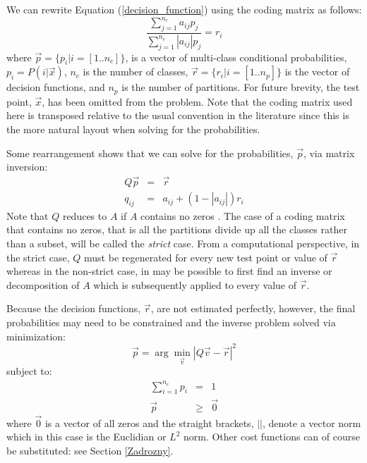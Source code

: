 We can rewrite Equation (\ref{decision_function}) using the coding 
matrix as follows:
\begin{equation}
	\frac{\sum_{j=1}^{n_c} a_{ij} p_j}{\sum_{j=1}^{n_c} |a_{ij}| p_j} = r_i
	\label{non_hier}
\end{equation}
where $\vec p=\lbrace p_i | i=[1..n_c]\rbrace$, 
is a vector of multi-class conditional probabilities, $p_i=P(i|\vec x)$, 
$n_c$ is the number of classes,
$\vec r=\lbrace r_i| i=[1..n_p]\rbrace$ 
is the vector of decision functions,
and
$n_p$ is the number of partitions.
For future brevity, the test point, $\vec x$, has been omitted from the problem. 
Note that the coding matrix used here is transposed relative to the usual
convention in the literature since this is the more natural layout when 
solving for the probabilities.

Some rearrangement shows that
we can solve for the probabilities, $\vec p$, via matrix inversion:
\begin{eqnarray}
	Q \vec p & = & \vec r \label{basic_system}\\
	q_{ij} & = & a_{ij} + (1-|a_{ij}|) r_i 
	\label{matrix_equation2}
\end{eqnarray}
Note that $Q$ reduces to $A$ if $A$ contains no zeros \citep{Kong_Dietterich1997}.
The case of a coding matrix that contains no zeros, that is all the partitions divide up all the
classes rather than a subset, will be called the {\it strict} case.
From a computational perspective,
in the strict case,
$Q$ must be regenerated for every new test point or value of $\vec r$ 
whereas in the non-strict case, in may be possible to first find an inverse or
decomposition of $A$ which is subsequently
applied to every value of $\vec r$.

Because the decision functions, $\vec r$, are not estimated perfectly, however,
the final probabilities may need to be constrained and the inverse
problem solved via minimization:
\begin{equation}
	\vec p = \arg \min_{\vec v} | Q \vec v - \vec r |^2 \label{minimization_problem}
\end{equation}
subject to:
\begin{eqnarray}
	\sum_{i=1}^{n_c} p_i & = & 1 \label{normalization}\\
	\vec p & \ge & \vec 0 \label{nonnegative}
\end{eqnarray}
where 
$\vec 0$ is a vector of all zeros and
the straight brackets, $||$, denote a vector norm which  
in this case is the Euclidian or $L^2$ norm.
Other cost functions can of course be substituted: see Section \ref{Zadrozny}.


